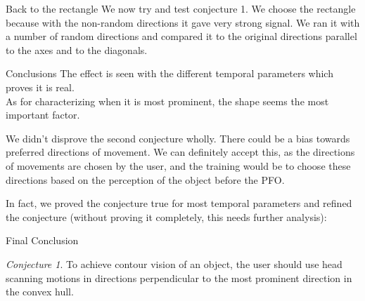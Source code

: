 \documentclass[]{beamer}
\theoremstyle{remark}
\newtheorem{conjecture}[theorem]{Conjecture}
\begin{document}
\begin{frame}{Back to the rectangle}
We now try and test conjecture 1. We choose the rectangle because with the non-random directions it gave very strong signal. We ran it with a number of random directions and compared it to the original directions parallel to the axes and to the diagonals.
\end{frame}

\begin{frame}{Conclusions}
The effect is seen with the different temporal parameters which proves it is real. \\
As for characterizing when it is most prominent, the shape seems the most important factor.

We didn't disprove the second conjecture wholly. There could be a bias towards preferred directions of movement. We can definitely accept this, as the directions of movements are chosen by the user, and the training would be to choose these directions based on the perception of the object before the PFO.

In fact, we proved the conjecture true for most temporal parameters and refined the conjecture (without proving it completely, this needs further analysis):

\end{frame}

\begin{frame}{Final Conclusion}
\begin{conjecture}
	To achieve contour vision of an object, the user should use head scanning motions in directions perpendicular to the most prominent direction in the convex hull.
\end{conjecture}
\end{frame}




\end{document}
